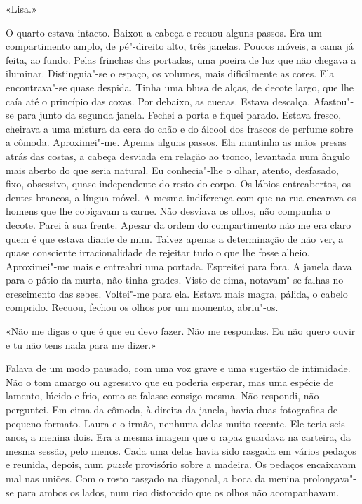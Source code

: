 «Lisa.»

O quarto estava intacto. Baixou a cabeça e recuou alguns passos. Era um
compartimento amplo, de pé"-direito alto, três janelas. Poucos móveis, a
cama já feita, ao fundo. Pelas frinchas das portadas, uma poeira de luz
que não chegava a iluminar. Distinguia"-se o espaço, os volumes, mais
dificilmente as cores. Ela encontrava"-se quase despida. Tinha uma blusa
de alças, de decote largo, que lhe caía até o princípio das coxas. Por
debaixo, as cuecas. Estava descalça. Afastou"-se para junto da segunda
janela. Fechei a porta e fiquei parado. Estava fresco, cheirava a uma
mistura da cera do chão e do álcool dos frascos de perfume sobre a
cômoda. Aproximei"-me. Apenas alguns passos. Ela mantinha as mãos presas
atrás das costas, a cabeça desviada em relação ao tronco, levantada num
ângulo mais aberto do que seria natural. Eu conhecia"-lhe o olhar,
atento, desfasado, fixo, obsessivo, quase independente do resto do
corpo. Os lábios entreabertos, os dentes brancos, a língua móvel. A
mesma indiferença com que na rua encarava os homens que lhe cobiçavam a
carne. Não desviava os olhos, não compunha o decote. Parei à sua frente.
Apesar da ordem do compartimento não me era claro quem é que estava
diante de mim. Talvez apenas a determinação de não ver, a quase
consciente irracionalidade de rejeitar tudo o que lhe fosse alheio.
Aproximei"-me mais e entreabri uma portada. Espreitei para fora. A
janela dava para o pátio da murta, não tinha grades. Visto de cima,
notavam"-se falhas no crescimento das sebes. Voltei"-me para ela. Estava
mais magra, pálida, o cabelo comprido. Recuou, fechou os olhos por um
momento, abriu"-os.

«Não me digas o que é que eu devo fazer. Não me respondas. Eu não quero
ouvir e tu não tens nada para me dizer.»

Falava de um modo pausado, com uma voz grave e uma sugestão de
intimidade. Não o tom amargo ou agressivo que eu poderia esperar, mas
uma espécie de lamento, lúcido e frio, como se falasse consigo mesma.
Não respondi, não perguntei. Em cima da cômoda, à direita da janela,
havia duas fotografias de pequeno formato. Laura e o irmão, nenhuma
delas muito recente. Ele teria seis anos, a menina dois. Era a mesma
imagem que o rapaz guardava na carteira, da mesma sessão, pelo menos.
Cada uma delas havia sido rasgada em vários pedaços e reunida, depois,
num \emph{puzzle} provisório sobre a madeira. Os pedaços encaixavam mal
nas uniões. Com o rosto rasgado na diagonal, a boca da menina
prolongava"-se para ambos os lados, num riso distorcido que os olhos não
acompanhavam.

